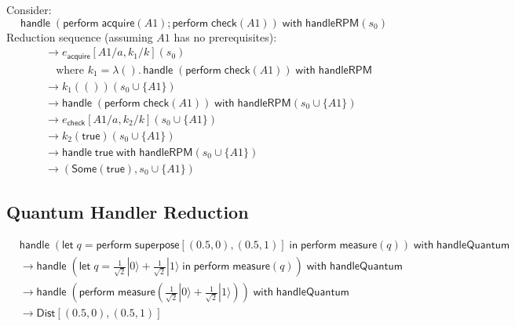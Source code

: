 \begin{example}
\label{ex:rpm-acquire-reduction}
Consider:
\[
\mathsf{handle}\; (\mathsf{perform}\; \mathsf{acquire}(A1); \mathsf{perform}\; \mathsf{check}(A1))\; \mathsf{with}\; \mathsf{handleRPM}(s_0)
\]
Reduction sequence (assuming $A1$ has no prerequisites):
\begin{align}
&\to e_{\mathsf{acquire}}[A1/a, k_1/k](s_0) \\
&\quad \text{where } k_1 = \lambda ().\, \mathsf{handle}\; (\mathsf{perform}\; \mathsf{check}(A1))\; \mathsf{with}\; \mathsf{handleRPM} \\
&\to k_1(())(s_0 \cup \{A1\}) \\
&\to \mathsf{handle}\; (\mathsf{perform}\; \mathsf{check}(A1))\; \mathsf{with}\; \mathsf{handleRPM}(s_0 \cup \{A1\}) \\
&\to e_{\mathsf{check}}[A1/a, k_2/k](s_0 \cup \{A1\}) \\
&\to k_2(\mathsf{true})(s_0 \cup \{A1\}) \\
&\to \mathsf{handle}\; \mathsf{true}\; \mathsf{with}\; \mathsf{handleRPM}(s_0 \cup \{A1\}) \\
&\to (\mathsf{Some}(\mathsf{true}), s_0 \cup \{A1\})
\end{align}
\end{example}

\subsection{Quantum Handler Reduction}
\label{subsec:quantum-reduction}

\begin{example}
\label{ex:quantum-reduction}
\begin{align}
&\mathsf{handle}\; (\mathsf{let}\; q = \mathsf{perform}\; \mathsf{superpose}[(0.5, 0), (0.5, 1)]\; \mathsf{in}\; \mathsf{perform}\; \mathsf{measure}(q))\; \mathsf{with}\; \mathsf{handleQuantum} \\
&\to \mathsf{handle}\; (\mathsf{let}\; q = \frac{1}{\sqrt{2}}|0\rangle + \frac{1}{\sqrt{2}}|1\rangle\; \mathsf{in}\; \mathsf{perform}\; \mathsf{measure}(q))\; \mathsf{with}\; \mathsf{handleQuantum} \\
&\to \mathsf{handle}\; (\mathsf{perform}\; \mathsf{measure}(\frac{1}{\sqrt{2}}|0\rangle + \frac{1}{\sqrt{2}}|1\rangle))\; \mathsf{with}\; \mathsf{handleQuantum} \\
&\to \mathsf{Dist}[(0.5, 0), (0.5, 1)]
\end{align}
\end{example}

